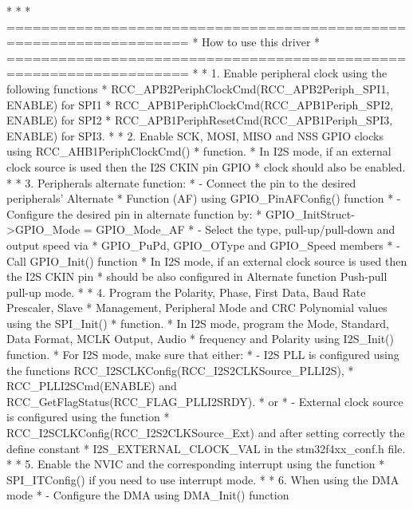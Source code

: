 \begin{DoxyVerb}*          
*                    
*          ===================================================================
*                                 How to use this driver
*          ===================================================================
*    
*          1. Enable peripheral clock using the following functions 
*             RCC_APB2PeriphClockCmd(RCC_APB2Periph_SPI1, ENABLE) for SPI1
*             RCC_APB1PeriphClockCmd(RCC_APB1Periph_SPI2, ENABLE) for SPI2
*             RCC_APB1PeriphResetCmd(RCC_APB1Periph_SPI3, ENABLE) for SPI3.
*
*          2. Enable SCK, MOSI, MISO and NSS GPIO clocks using RCC_AHB1PeriphClockCmd()
*             function.
*             In I2S mode, if an external clock source is used then the I2S CKIN pin GPIO
*             clock should also be enabled.
*
*          3. Peripherals alternate function: 
*                 - Connect the pin to the desired peripherals' Alternate 
*                   Function (AF) using GPIO_PinAFConfig() function
*                 - Configure the desired pin in alternate function by:
*                   GPIO_InitStruct->GPIO_Mode = GPIO_Mode_AF
*                 - Select the type, pull-up/pull-down and output speed via 
*                   GPIO_PuPd, GPIO_OType and GPIO_Speed members
*                 - Call GPIO_Init() function
*              In I2S mode, if an external clock source is used then the I2S CKIN pin
*              should be also configured in Alternate function Push-pull pull-up mode. 
*        
*          4. Program the Polarity, Phase, First Data, Baud Rate Prescaler, Slave 
*             Management, Peripheral Mode and CRC Polynomial values using the SPI_Init()
*             function.
*             In I2S mode, program the Mode, Standard, Data Format, MCLK Output, Audio 
*             frequency and Polarity using I2S_Init() function.
*             For I2S mode, make sure that either:
*              - I2S PLL is configured using the functions RCC_I2SCLKConfig(RCC_I2S2CLKSource_PLLI2S), 
*                RCC_PLLI2SCmd(ENABLE) and RCC_GetFlagStatus(RCC_FLAG_PLLI2SRDY).
*              or 
*              - External clock source is configured using the function 
*                RCC_I2SCLKConfig(RCC_I2S2CLKSource_Ext) and after setting correctly the define constant
*                I2S_EXTERNAL_CLOCK_VAL in the stm32f4xx_conf.h file. 
*
*          5. Enable the NVIC and the corresponding interrupt using the function 
*             SPI_ITConfig() if you need to use interrupt mode. 
*
*          6. When using the DMA mode 
*                   - Configure the DMA using DMA_Init() function

\end{DoxyVerb}
